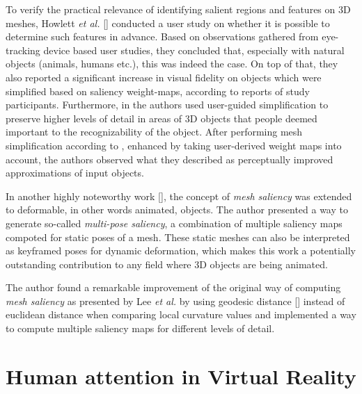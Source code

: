 To verify the practical relevance of identifying salient regions and features on 3D meshes, Howlett \textit{et al.} [\cite{howlett2005predicting}] conducted a user study on whether it is possible to determine such features in advance. Based on observations gathered from eye-tracking device based user studies, they concluded that, especially with natural objects (animals, humans etc.), this was indeed the case. On top of that, they also reported a significant increase in visual fidelity on objects which were simplified based on saliency weight-maps, according to reports of study participants. Furthermore, in \cite{kho2003user} the authors used user-guided simplification to preserve higher levels of detail in areas of 3D objects that people deemed important to the recognizability of the object. After performing mesh simplification according to \cite{garland1997qslim}, enhanced by taking user-derived weight maps into account, the authors observed what they described as perceptually improved approximations of input objects.

In another highly noteworthy work [\cite{munaretti2007perceptual}], the concept of \textit{mesh saliency} was extended to deformable, in other words animated, objects. The author presented a way to generate so-called \textit{multi-pose saliency}, a combination of multiple saliency maps compoted for static poses of a mesh. These static meshes can also be interpreted as keyframed poses for dynamic deformation, which makes this work a potentially outstanding contribution to any field where 3D objects are being animated.

The author found a remarkable improvement of the original way of computing \textit{mesh saliency} as presented by Lee \textit{et al.} by using geodesic distance [\cite{surazhsky2005fast}] instead of euclidean distance when comparing local curvature values and implemented a way to compute multiple saliency maps for different levels of detail.

\section{Human attention in Virtual Reality}


